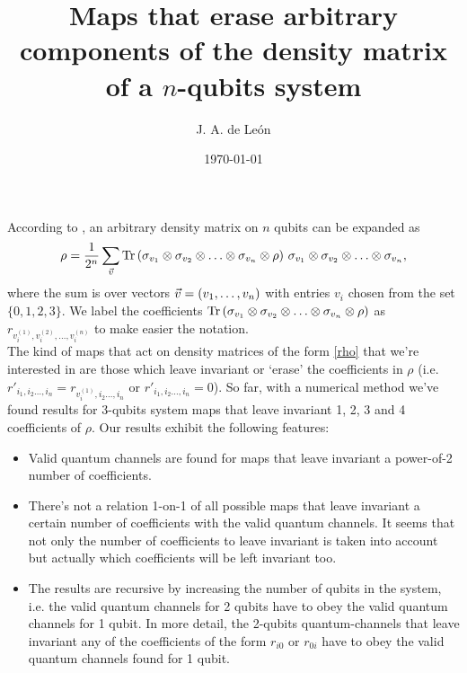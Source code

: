 \documentclass[11pt]{article}
\begin{document}
\title{Maps that erase arbitrary components of the density matrix of a $n$-qubits system} %
\author{J. A. de Le\'on} 


\date{\today}  

\maketitle


According to \cite{nielsen_chuang_2011}, an arbitrary density matrix on $n$ qubits can be expanded as
\begin{align}
	\rho = \frac{1}{2^n}\sum _{\vec{v}} \Tr \qty( \sigma _{v_1} \otimes \sigma_{v_2} \otimes \ldots \otimes \sigma_{v_n} \otimes \rho )\  \sigma _{v_1} \otimes \sigma_{v_2} \otimes \ldots \otimes \sigma_{v_n},
	\label{rho}
\end{align}
where the sum is over vectors $\vec{v}=\qty(v_1,\ldots, v_n)$ with entries $v_i$ chosen from the set $\{0,1,2,3\}$. We label the coefficients $\Tr \qty( \sigma _{v_1} \otimes \sigma_{v_2} \otimes \ldots \otimes \sigma_{v_n} \otimes \rho )$ as $r_{v_i^{(1)}, v_i^{(2)},\ldots, v_i^{(n)}}$ to make easier the notation. \\

The kind of maps that act on density matrices of the form \eqref{rho} that we're interested in are those which leave invariant or
`erase' the coefficients in $\rho$ (i.e. $r'_{i_1, i_2\ldots, i_n}=r_{v_i^{(1)}, i_2\ldots, i_n}$ or $r'_{i_1, i_2\ldots, i_n}=0$). So far, with
a numerical method we've found results for 3-qubits system maps that leave invariant 1, 2, 3 and 4 coefficients of $\rho$. Our
results exhibit the following features:
\begin{itemize}
	\item Valid quantum channels are found for maps that leave invariant a power-of-2 number of coefficients.
	\item There's not a relation 1-on-1 of all possible maps that leave invariant a certain number of coefficients with the valid
	quantum channels. It seems that not only the number of coefficients to leave invariant is taken into account but actually
	which coefficients will be left invariant too.
	\item The results are recursive by increasing the number of qubits in the system, i.e. the valid quantum channels for 2
	qubits have to obey the valid quantum channels for 1 qubit. In more detail, the 2-qubits quantum-channels that leave
	invariant any of the coefficients of the form $r_{i0}$ or $r_{0i}$ have to obey the valid quantum channels found for 1
	qubit.
\end{itemize}
\end{document}
